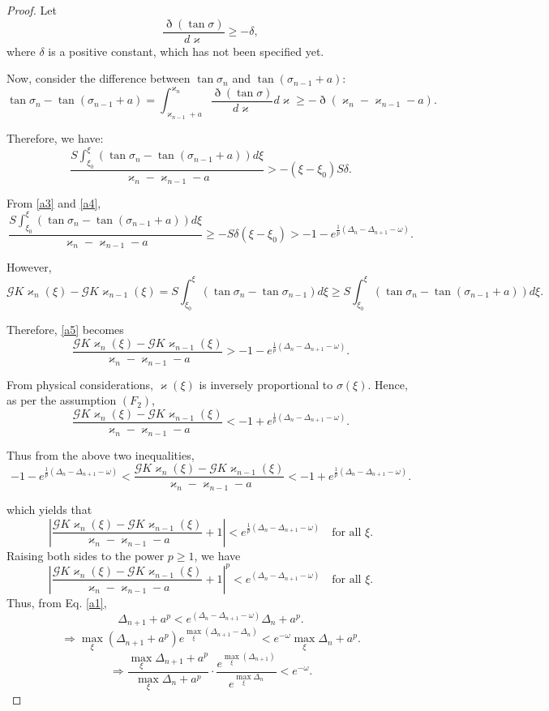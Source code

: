 \documentclass[pdflatex,sn-mathphys-num]{sn-jnl}%
\theoremstyle{thmstyleone}%
\theoremstyle{thmstyletwo}%
\theoremstyle{thmstylethree}%
\begin{document}
\begin{proof}
Let
\begin{equation*}
\frac{\eth(\tan \sigma)}{d\varkappa} \ge -\delta , 
\end{equation*}
where $\delta$ is a positive constant, which has not been specified yet.

Now, consider the difference between $\tan \sigma_n$ and $\tan (\sigma_{n-1}+a)$:
\[
\tan \sigma_n - \tan (\sigma_{n-1}+a) = \int_{\varkappa_{n-1}+a}^{\varkappa_n} \frac{\eth(\tan \sigma)}{d\varkappa} d\varkappa \ge -\eth(\varkappa_n-\varkappa_{n-1}-a).
\]

Therefore, we have:
\begin{equation}\label{a4}
\frac{S \int_{\xi_0}^{\xi } (\tan \sigma_n - \tan (\sigma_{n-1}+a)) d\xi} {\varkappa_n - \varkappa_{n-1}-a} > - (\xi - \xi_0)S\delta.
\end{equation}

From \eqref{a3} and \eqref{a4},
\begin{equation}\label{a5}
\frac{S \int_{\xi_0}^{\xi } (\tan \sigma_n - \tan (\sigma_{n-1}+a)) d\xi} {\varkappa_n - \varkappa_{n-1}-a}\ge -S\delta(\xi-\xi_0) > - 1 - e^{\frac{1}{p}(\Delta_n-\Delta_{n+1}-\omega  )}. 
\end{equation}

However,
\[
\mathcal{G}K\varkappa_n(\xi) - \mathcal{G}K\varkappa_{n-1}(\xi)
= S \int_{\xi_0}^{\xi } (\tan \sigma_n - \tan \sigma_{n-1}) d\xi \ge S \int_{\xi_0}^{\xi } (\tan \sigma_n - \tan (\sigma_{n-1}+a)) d\xi.
\]

Therefore, \eqref{a5} becomes
\[
\frac{\mathcal{G}K\varkappa_n(\xi) - \mathcal{G}K\varkappa_{n-1}(\xi)}{\varkappa_n - \varkappa_{n-1}-a} >  - 1 - e^{\frac{1}{p}(\Delta_n-\Delta_{n+1}-\omega  )}.
\]

From physical considerations, $\varkappa(\xi)$ is inversely proportional to $\sigma(\xi)$. Hence, as per the assumption $(F_2)$,
\[
\dfrac{\mathcal{G}K\varkappa_{n}(\xi) - \mathcal{G}K\varkappa_{n-1}(\xi)}{\varkappa_n - \varkappa_{n-1}-a} < -1 + e^{\frac{1}{p}(\Delta_n-\Delta_{n+1}-\omega  )}.
\]

Thus from the above two inequalities,
\[
-1 - e^{\frac{1}{p}(\Delta_n-\Delta_{n+1}-\omega  )} < \frac{\mathcal{G}K\varkappa_n(\xi) - \mathcal{G}K\varkappa_{n-1}(\xi)}{\varkappa_n - \varkappa_{n-1}-a} < -1 + e^{\frac{1}{p}(\Delta_n-\Delta_{n+1}-\omega  )}.
\]

which yields that
\[
\left| \frac{\mathcal{G}K\varkappa_n(\xi) - \mathcal{G}K\varkappa_{n-1}(\xi)}{\varkappa_n - \varkappa_{n-1}-a} + 1 \right| < e^{\frac{1}{p}(\Delta_n-\Delta_{n+1}-\omega  )}
\quad \text{for all } \xi.
\]
Raising both sides to the power $p\ge1$, we have
\[
\left| \frac{\mathcal{G}K\varkappa_n(\xi) - \mathcal{G}K\varkappa_{n-1}(\xi)}{\varkappa_n - \varkappa_{n-1}-a} + 1 \right|^p < e^{(\Delta_n-\Delta_{n+1}-\omega  )}
\quad \text{for all } \xi.
\]
Thus, from Eq. \eqref{a1},
\[
\Delta_{n+1}+a^p < e^{(\Delta_n-\Delta_{n+1}-\omega  )} \Delta_n+a^p.
\]
\[\Rightarrow \max_{\xi }\left(\Delta_{n+1}+a^p\right)e^{\max_{\xi }(\Delta_{n+1}-\Delta_n)} < e^{-\omega  } \max_{\xi }\Delta_n+a^p.\]
\[\Rightarrow \frac{\max_{\xi }\Delta_{n+1}+a^p}{\max_{\xi }\Delta_n+a^p}\cdot\frac{e^{\max_{\xi }(\Delta_{n+1})}}{e^{\max_{\xi }\Delta_n}} < e^{-\omega  } .\]


\end{proof}
\end{document}
